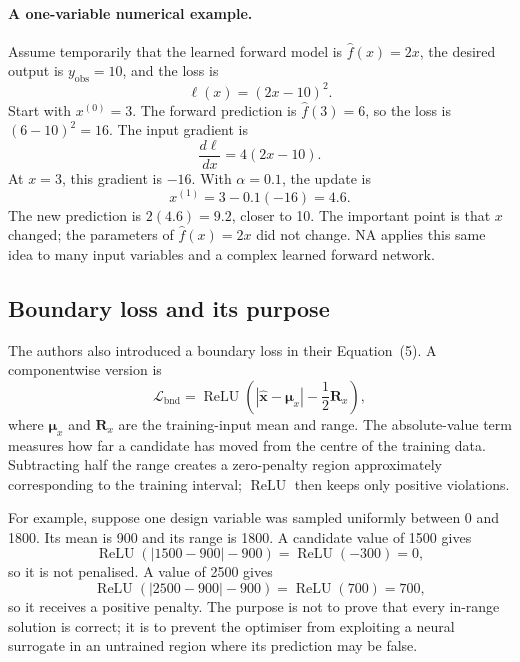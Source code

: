 \documentclass[11pt]{article}
\newcommand{\vect}[1]{\mathbf{#1}}
\begin{document}
\paragraph{A one-variable numerical example.}
Assume temporarily that the learned forward model is $\hat f(x)=2x$, the desired output is $y_{\mathrm{obs}}=10$, and the loss is
\begin{equation}
    \ell(x)=(2x-10)^2.
    \label{eq:na_scalar_loss}
\end{equation}
Start with $x^{(0)}=3$. The forward prediction is $\hat f(3)=6$, so the loss is $(6-10)^2=16$. The input gradient is
\begin{equation}
    \frac{d\ell}{dx}=4(2x-10).
    \label{eq:na_scalar_gradient}
\end{equation}
At $x=3$, this gradient is $-16$. With $\alpha=0.1$, the update is
\begin{equation}
    x^{(1)}=3-0.1(-16)=4.6.
    \label{eq:na_scalar_update}
\end{equation}
The new prediction is $2(4.6)=9.2$, closer to 10. The important point is that $x$ changed; the parameters of $\hat f(x)=2x$ did not change. NA applies this same idea to many input variables and a complex learned forward network.

\subsection{Boundary loss and its purpose}

The authors also introduced a boundary loss in their Equation~(5). A componentwise version is
\begin{equation}
    \mathcal{L}_{\mathrm{bnd}}=
    \operatorname{ReLU}\left(
    \left|\hat{\vect{x}}-\boldsymbol{\mu}_x\right|-
    \frac{1}{2}\vect{R}_x
    \right),
    \label{eq:boundary_loss}
\end{equation}
where $\boldsymbol{\mu}_x$ and $\vect{R}_x$ are the training-input mean and range. The absolute-value term measures how far a candidate has moved from the centre of the training data. Subtracting half the range creates a zero-penalty region approximately corresponding to the training interval; $\operatorname{ReLU}$ then keeps only positive violations.

For example, suppose one design variable was sampled uniformly between 0 and 1800. Its mean is 900 and its range is 1800. A candidate value of 1500 gives
\begin{equation}
    \operatorname{ReLU}(|1500-900|-900)=\operatorname{ReLU}(-300)=0,
\end{equation}
so it is not penalised. A value of 2500 gives
\begin{equation}
    \operatorname{ReLU}(|2500-900|-900)=\operatorname{ReLU}(700)=700,
\end{equation}
so it receives a positive penalty. The purpose is not to prove that every in-range solution is correct; it is to prevent the optimiser from exploiting a neural surrogate in an untrained region where its prediction may be false.
\end{document}
